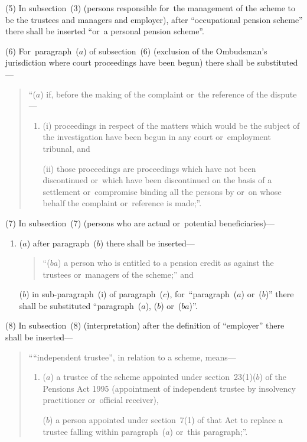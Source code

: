 \documentclass[12pt,a4paper]{article}
\begin{document}
(5) In subsection~(3)  (persons responsible for~the management of the scheme to be the trustees and managers and employer), after “occupational pension scheme” there shall be inserted “or~a personal pension scheme”.

(6) For~paragraph~($a$)  of subsection~(6)  (exclusion of the Ombudsman’s jurisdiction where court proceedings have been begun) there shall be substituted—
\begin{quotation}
“($a$) if, before the making of the complaint or~the reference of the dispute—
\begin{enumerate}\item[]
(i) proceedings in respect of the matters which would be the subject of the investigation have been begun in any court or~employment tribunal, and

(ii) those proceedings are proceedings which have not been discontinued or~which have been discontinued on the basis of a settlement or~compromise binding all the persons by or~on whose behalf the complaint or~reference is made;”.
\end{enumerate}
\end{quotation}

(7) In subsection~(7)  (persons who are actual or~potential beneficiaries)—
\begin{enumerate}\item[]
($a$) after paragraph~($b$)  there shall be inserted—
\begin{quotation}
“($ba$) a person who is entitled to a pension credit as against the trustees or~managers of the scheme;” and
\end{quotation}

($b$) in sub-paragraph~(i)  of paragraph~($c$), for~“paragraph~($a$)  or~($b$)” there shall be substituted “paragraph~($a$), ($b$)  or~($ba$)”.
\end{enumerate}

(8) In subsection~(8)  (interpretation) after the definition of “employer” there shall be inserted—
\begin{quotation}
““independent trustee”, in relation to a scheme, means—
\begin{enumerate}\item[]
($a$) a trustee of the scheme appointed under section~23(1)($b$)  of the Pensions Act 1995 (appointment of independent trustee by insolvency practitioner or~official receiver),

($b$) a person appointed under section~7(1)  of that Act to replace a trustee falling within paragraph~($a$)  or~this paragraph;”.
\end{enumerate}
\end{quotation}
\end{document}
